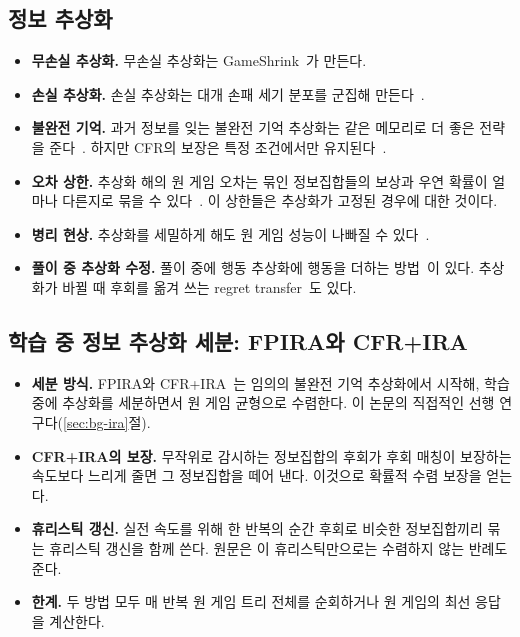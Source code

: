 \subsection{정보 추상화}
\begin{itemize}
  \item \textbf{무손실 추상화.} 무손실 추상화는 GameShrink~\citep{gilpin2007lossless}가 만든다.
  \item \textbf{손실 추상화.} 손실 추상화는 대개 손패 세기 분포를 군집해 만든다~\citep{johanson2013evaluating,ganzfried2014potential}.
  \item \textbf{불완전 기억.} 과거 정보를 잊는 불완전 기억 추상화는 같은 메모리로 더 좋은 전략을 준다~\citep{waugh2009practical}. 하지만 CFR의 보장은 특정 조건에서만 유지된다~\citep{lanctot2012no}.
  \item \textbf{오차 상한.} 추상화 해의 원 게임 오차는 묶인 정보집합들의 보상과 우연 확률이 얼마나 다른지로 묶을 수 있다~\citep{kroer2014extensive,kroer2016imperfect,kroer2018unified}. 이 상한들은 추상화가 고정된 경우에 대한 것이다.
  \item \textbf{병리 현상.} 추상화를 세밀하게 해도 원 게임 성능이 나빠질 수 있다~\citep{waugh2009abstraction}.
  \item \textbf{풀이 중 추상화 수정.} 풀이 중에 행동 추상화에 행동을 더하는 방법~\citep{brown2015simultaneous}이 있다. 추상화가 바뀔 때 후회를 옮겨 쓰는 regret transfer~\citep{brown2014regret}도 있다.
\end{itemize}

\subsection{학습 중 정보 추상화 세분: FPIRA와 CFR+IRA}
\begin{itemize}
  \item \textbf{세분 방식.} FPIRA와 CFR+IRA~\citep{cermak2017algorithm,cermak2020automated}는 임의의 불완전 기억 추상화에서 시작해, 학습 중에 추상화를 세분하면서 원 게임 균형으로 수렴한다. 이 논문의 직접적인 선행 연구다(\ref{sec:bg-ira}절).
  \item \textbf{CFR+IRA의 보장.} 무작위로 감시하는 정보집합의 후회가 후회 매칭이 보장하는 속도보다 느리게 줄면 그 정보집합을 떼어 낸다. 이것으로 확률적 수렴 보장을 얻는다.
  \item \textbf{휴리스틱 갱신.} 실전 속도를 위해 한 반복의 순간 후회로 비슷한 정보집합끼리 묶는 휴리스틱 갱신을 함께 쓴다. 원문은 이 휴리스틱만으로는 수렴하지 않는 반례도 준다.
  \item \textbf{한계.} 두 방법 모두 매 반복 원 게임 트리 전체를 순회하거나 원 게임의 최선 응답을 계산한다.
\end{itemize}

